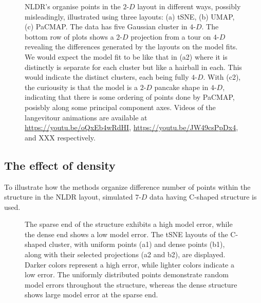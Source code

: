 \documentclass[
  12pt]{article}
\newcommand\gD{$2\text{-}D$}
\begin{document}
\begin{figure}[H]


\caption{\label{fig-five-gau-projs}NLDR's organise points in the \gD{}
layout in different ways, possibly misleadingly, illustrated using three
layouts: (a) tSNE, (b) UMAP, (c) PaCMAP. The data has five Gaussian
cluster in \(4\text{-}D\). The bottom row of plots shows a \gD{}
projection from a tour on \(4\text{-}D\) revealing the differences
generated by the layouts on the model fits. We would expect the model
fit to be like that in (a2) where it is distinctly is separate for each
cluster but like a hairball in each. This would indicate the distinct
clusters, each being fully \(4\text{-}D\). With (c2), the curiousity is
that the model is a \gD{} pancake shape in \(4\text{-}D\), indicating
that there is some ordering of points done by PaCMAP, posisbly along
some principal component axes. Videos of the langevitour animations are
available at \url{https://youtu.be/oQxEb4wRdHI},
\url{https://youtu.be/JW49csPpDx4}, and XXX respectively.}

\end{figure}%

\subsection{The effect of density}\label{the-effect-of-density}

To illustrate how the methods organize difference number of points
within the structure in the NLDR layout, simulated \(7\text{-}D\) data
having C-shaped structure is used.

\begin{figure}[H]


\caption{\label{fig-one-dens_clust-error}The sparse end of the structure
exhibits a high model error, while the dense end shows a low model
error. The tSNE layouts of the C-shaped cluster, with uniform points
(a1) and dense points (b1), along with their selected projections (a2
and b2), are displayed. Darker colors represent a high error, while
lighter colors indicate a low error. The uniformly distributed points
demonstrate random model errors throughout the structure, whereas the
dense structure shows large model error at the sparse end.}

\end{figure}%
\end{document}
